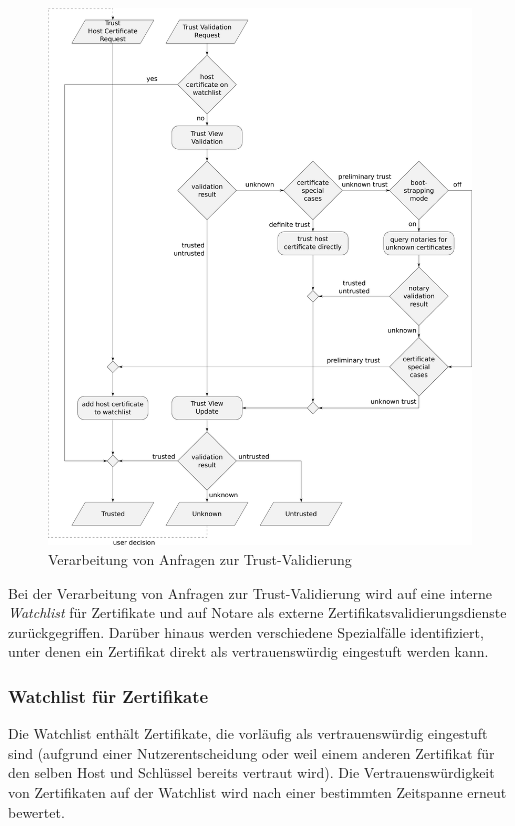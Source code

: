 \documentclass[accentcolor=tud1c,article,colorback,11pt]{tudreport}
\begin{document}
\begin{figure}
  \centering
  \includegraphics[width=\textwidth]{validation}
  \caption{Verarbeitung von Anfragen zur Trust-Validierung}
  \label{validation}
\end{figure}

Bei der Verarbeitung von Anfragen zur Trust-Validierung wird auf eine interne \emph{Watchlist} für Zertifikate und auf Notare als externe Zertifikatsvalidierungsdienste zurückgegriffen. Darüber hinaus werden verschiedene Spezialfälle identifiziert, unter denen ein Zertifikat direkt als vertrauenswürdig eingestuft werden kann.

\subsubsection{Watchlist für Zertifikate}

Die Watchlist enthält Zertifikate, die vorläufig als vertrauenswürdig eingestuft sind (aufgrund einer Nutzerentscheidung oder weil einem anderen Zertifikat für den selben Host und Schlüssel bereits vertraut wird). Die Vertrauenswürdigkeit von Zertifikaten auf der Watchlist wird nach einer bestimmten Zeitspanne erneut bewertet.
\end{document}

